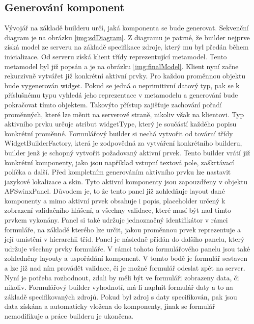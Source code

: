 \subsection{Generování komponent}
Vývojář na základě builderu určí, jaká komponenta se bude generovat. Sekvenční diagram je na obrázku \ref{img:sdDiagram}. Z diagramu je patrné, že builder nejprve získá model ze serveru na základě specifikace zdroje, který mu byl předán během inicializace. Od serveru získá klient třídy reprezentující metamodel. Tento metamodel byl již popsán a je na obrázku \ref{img:finalModel}. Klient nyní začne rekurzivně vytvářet již konkrétní aktivní prvky. Pro každou proměnnou objektu bude vygenerován widget. Pokud se jedná o neprimitivní datový typ, pak se k příslušnému typu vyhledá jeho reprezentace v metamodelu a generování bude pokračovat tímto objektem. Takovýto přístup zajišťuje zachování pořadí proměnných, které lze měnit na serverové straně, nikoliv však na klientovi. Typ aktivního prvku určuje atribut widgetType, který je součástí každého popisu konkrétní proměnné. Formulářový builder si nechá vytvořit od tovární třídy WidgetBuilderFactory, která je zodpovědná za vytváření konkrétního builderu, builder jenž je schopný vytvořit požadovaný aktivní prvek. Tento builder vrátí již konkrétní komponenty, jako jsou například vstupní textová pole, zaškrtávací políčka a další. Před kompletním generováním aktivního prvku lze nastavit jazykové lokalizace a skin. Tyto aktivní komponenty jsou zapouzdřeny v objektu AFSwinxPanel. Důvodem je, to že tento panel již zohledňuje layout dané komponenty a mimo aktivní prvek obsahuje i popis, placeholder určený k zobrazení validačního hlášení, a všechny validace, které musí být nad tímto prvkem vykonány. Panel si také udržuje jednoznačný identifikátor v rámci formuláře, na základě kterého lze určit, jakou proměnnou prvek reprezentuje a její umístění v hierarchii tříd. Panel je následně přidán do dalšího panelu, který udržuje všechny prvky formuláře. V rámci tohoto formulářového panelu jsou také zohledněny layouty a uspořádání komponent. V tomto bodě je formulář sestaven a lze již nad ním provádět validace, či je možné formulář odeslat zpět na server. Nyní je potřeba rozhodnout, zdali by měli být ve formuláři zobrazeny data, či nikoliv. Formulářový builder vyhodnotí, má-li naplnit formulář daty a to na základě specifikovaných zdrojů. Pokud byl zdroj s daty specifikován, pak jsou data získána a automaticky vložena do komponenty, jinak se formulář nemodifikuje a práce builderu je ukončena.

